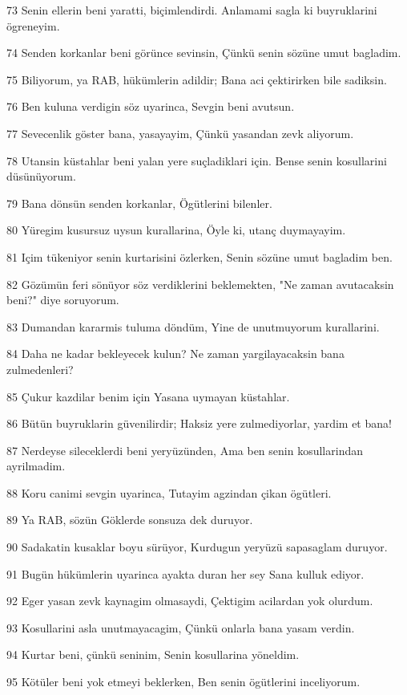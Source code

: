 \par 73 Senin ellerin beni yaratti, biçimlendirdi. Anlamami sagla ki buyruklarini ögreneyim.
\par 74 Senden korkanlar beni görünce sevinsin, Çünkü senin sözüne umut bagladim.
\par 75 Biliyorum, ya RAB, hükümlerin adildir; Bana aci çektirirken bile sadiksin.
\par 76 Ben kuluna verdigin söz uyarinca, Sevgin beni avutsun.
\par 77 Sevecenlik göster bana, yasayayim, Çünkü yasandan zevk aliyorum.
\par 78 Utansin küstahlar beni yalan yere suçladiklari için. Bense senin kosullarini düsünüyorum.
\par 79 Bana dönsün senden korkanlar, Ögütlerini bilenler.
\par 80 Yüregim kusursuz uysun kurallarina, Öyle ki, utanç duymayayim.
\par 81 Içim tükeniyor senin kurtarisini özlerken, Senin sözüne umut bagladim ben.
\par 82 Gözümün feri sönüyor söz verdiklerini beklemekten, "Ne zaman avutacaksin beni?" diye soruyorum.
\par 83 Dumandan kararmis tuluma döndüm, Yine de unutmuyorum kurallarini.
\par 84 Daha ne kadar bekleyecek kulun? Ne zaman yargilayacaksin bana zulmedenleri?
\par 85 Çukur kazdilar benim için Yasana uymayan küstahlar.
\par 86 Bütün buyruklarin güvenilirdir; Haksiz yere zulmediyorlar, yardim et bana!
\par 87 Nerdeyse sileceklerdi beni yeryüzünden, Ama ben senin kosullarindan ayrilmadim.
\par 88 Koru canimi sevgin uyarinca, Tutayim agzindan çikan ögütleri.
\par 89 Ya RAB, sözün Göklerde sonsuza dek duruyor.
\par 90 Sadakatin kusaklar boyu sürüyor, Kurdugun yeryüzü sapasaglam duruyor.
\par 91 Bugün hükümlerin uyarinca ayakta duran her sey Sana kulluk ediyor.
\par 92 Eger yasan zevk kaynagim olmasaydi, Çektigim acilardan yok olurdum.
\par 93 Kosullarini asla unutmayacagim, Çünkü onlarla bana yasam verdin.
\par 94 Kurtar beni, çünkü seninim, Senin kosullarina yöneldim.
\par 95 Kötüler beni yok etmeyi beklerken, Ben senin ögütlerini inceliyorum.
